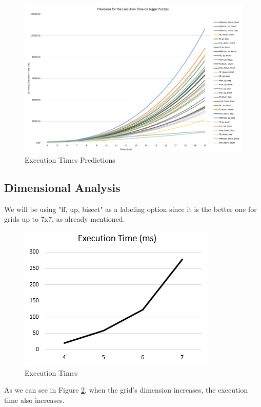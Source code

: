 \documentclass[runningheads]{llncs}
\begin{document}
\begin{figure}
    \centering
    \includegraphics[width=\textwidth]{img/previsions.png}
    \caption{Execution Times Predictions} \label{fig4}
\end{figure}

\subsection{Dimensional Analysis}

We will be using "ff, up, bisect" as a labeling option since it
    is the better one for grids up to 7x7, as already mentioned.

\begin{figure}
    \centering
    \includegraphics[scale=0.3]{img/dimensional_analysis.png}
    \caption{Execution Times} \label{fig5}
\end{figure}

As we can see in Figure \ref{fig5}, when the grid's dimension increases,
    the execution time also increases.
\end{document}
